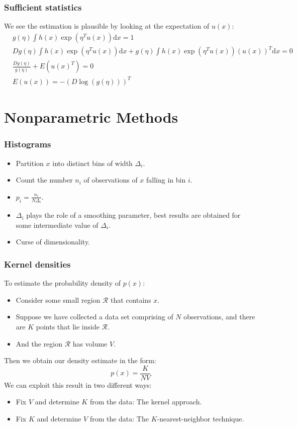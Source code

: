 \documentclass{beamer}
\begin{document}
\begin{frame}
    \frametitle{Sufficient statistics}
    We see the estimation is plausible by looking at the expectation of $u(x)$:
    \begin{align*}
        &g(\eta)\int{}h(x)\exp(\eta^{T}u(x))\mathrm{d}x=1 \\
        &Dg(\eta)\int{}h(x)\exp(\eta^{T}u(x))\mathrm{d}x+g(\eta)\int{}h(x)\exp(\eta^{T}u(x))(u(x))^{T}\mathrm{d}x=0 \\
        &\frac{Dg(\eta)}{g(\eta)}+E(u(x)^{T})=0 \\
        &E(u(x))=-(D\log(g(\eta)))^{T}
    \end{align*}
\end{frame}

\section{Nonparametric Methods}

\begin{frame}
    \frametitle{Histograms}
    \begin{itemize}
        \item Partition $x$ into distinct bins of width $\Delta_{i}$.
        \item Count the number $n_{i}$ of observations of $x$ falling in bin $i$.
        \item $p_{i}=\frac{n_{i}}{N\Delta_{i}}$.
        \item $\Delta_{i}$ plays the role of a smoothing parameter, best results are obtained for some intermediate value of $\Delta_{i}$.
        \item Curse of dimensionality.
    \end{itemize}
\end{frame}

\begin{frame}
    \frametitle{Kernel densities}
    To estimate the probability density of $p(x)$:
    \begin{itemize}
        \item Consider some small region $\mathcal{R}$ that contains $x$.
        \item Suppose we have collected a data set comprising of $N$ observations, and there are $K$ points that lie inside $\mathcal{R}$.
        \item And the region $\mathcal{R}$ has volume $V$.
    \end{itemize}
    Then we obtain our density estimate in the form:
    \begin{equation*}
        p(x)=\frac{K}{NV}
    \end{equation*}
    We can exploit this result in two different ways:
    \begin{itemize}
        \item Fix $V$ and determine $K$ from the data: The kernel approach.
        \item Fix $K$ and determine $V$ from the data: The $K$-nearest-neighbor technique.
    \end{itemize}
\end{frame}
\end{document}
